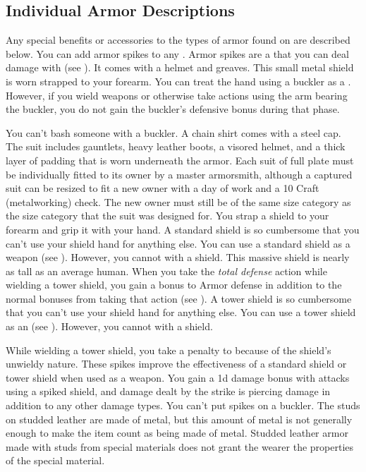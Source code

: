     \subsection{Individual Armor Descriptions}
        Any special benefits or accessories to the types of armor found on  are described below.
         You can add armor spikes to any .
        Armor spikes are a  that you can deal damage with (see ).
         It comes with a helmet and greaves.
         This small metal shield is worn strapped to your forearm.
        You can treat the hand using a buckler as a .
        However, if you wield weapons or otherwise take actions using the arm bearing the buckler, you do not gain the buckler's defensive bonus during that phase.
        \par You can't bash someone with a buckler.
         A chain shirt comes with a steel cap.
         The suit includes gauntlets, heavy leather boots, a visored helmet, and a thick layer of padding that is worn underneath the armor. Each suit of full plate must be individually fitted to its owner by a master armorsmith, although a captured suit can be resized to fit a new owner with a day of work and a  10 Craft (metalworking) check. The new owner must still be of the same size category as the size category that the suit was designed for.
         You strap a shield to your forearm and grip it with your hand.
        A standard shield is so cumbersome that you can't use your shield hand for anything else.
        You can use a standard shield as a weapon (see ).
        However, you cannot  with a shield.
         This massive shield is nearly as tall as an average human.
        When you take the \textit{total defense} action while wielding a tower shield, you gain a  bonus to Armor defense in addition to the normal bonuses from taking that action (see ).
        A tower shield is so cumbersome that you can't use your shield hand for anything else.
        You can use a tower shield as an  (see ).
        However, you cannot  with a shield.

        While wielding a tower shield, you take a  penalty to  because of the shield's unwieldy nature.
         These spikes improve the effectiveness of a standard shield or tower shield when used as a weapon.
        You gain a \plus1d damage bonus with attacks using a spiked shield, and damage dealt by the strike is piercing damage in addition to any other damage types.
        You can't put spikes on a buckler.
         The studs on studded leather are made of metal, but this amount of metal is not generally enough to make the item count as being made of metal.
        Studded leather armor made with studs from special materials does not grant the wearer the properties of the special material.

